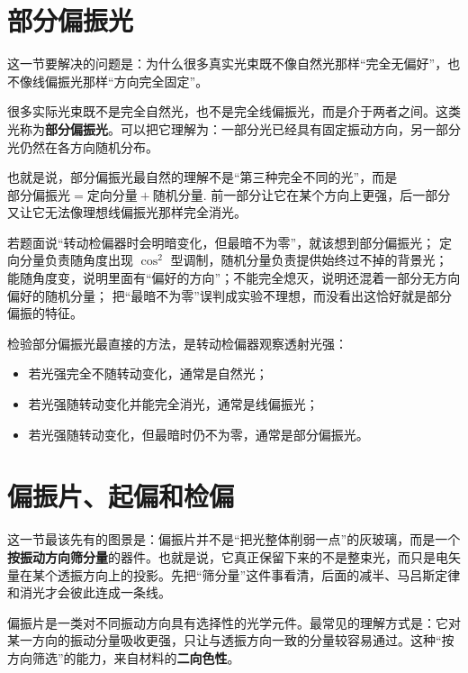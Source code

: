 \documentclass[lang=cn,11pt]{elegantbook}
\begin{document}
\section{部分偏振光}

这一节要解决的问题是：为什么很多真实光束既不像自然光那样“完全无偏好”，也不像线偏振光那样“方向完全固定”。

很多实际光束既不是完全自然光，也不是完全线偏振光，而是介于两者之间。这类光称为\textbf{部分偏振光}。可以把它理解为：一部分光已经具有固定振动方向，另一部分光仍然在各方向随机分布。

也就是说，部分偏振光最自然的理解不是“第三种完全不同的光”，而是
 \(\text{部分偏振光}=\text{定向分量}+\text{随机分量}.\) 
前一部分让它在某个方向上更强，后一部分又让它无法像理想线偏振光那样完全消光。

\begin{note}
 若题面说“转动检偏器时会明暗变化，但最暗不为零”，就该想到部分偏振光； 定向分量负责随角度出现 \(\cos^2\) 型调制，随机分量负责提供始终过不掉的背景光； 能随角度变，说明里面有“偏好的方向”；不能完全熄灭，说明还混着一部分无方向偏好的随机分量； 把“最暗不为零”误判成实验不理想，而没看出这恰好就是部分偏振的特征。
\end{note}

\begin{remark}
检验部分偏振光最直接的方法，是转动检偏器观察透射光强：
\begin{itemize}
 \item 若光强完全不随转动变化，通常是自然光；
 \item 若光强随转动变化并能完全消光，通常是线偏振光；
 \item 若光强随转动变化，但最暗时仍不为零，通常是部分偏振光。
\end{itemize}
\end{remark}

\section{偏振片、起偏和检偏}

这一节最该先有的图景是：偏振片并不是“把光整体削弱一点”的灰玻璃，而是一个\textbf{按振动方向筛分量}的器件。也就是说，它真正保留下来的不是整束光，而只是电矢量在某个透振方向上的投影。先把“筛分量”这件事看清，后面的减半、马吕斯定律和消光才会彼此连成一条线。

偏振片是一类对不同振动方向具有选择性的光学元件。最常见的理解方式是：它对某一方向的振动分量吸收更强，只让与透振方向一致的分量较容易通过。这种“按方向筛选”的能力，来自材料的\textbf{二向色性}。
\end{document}

